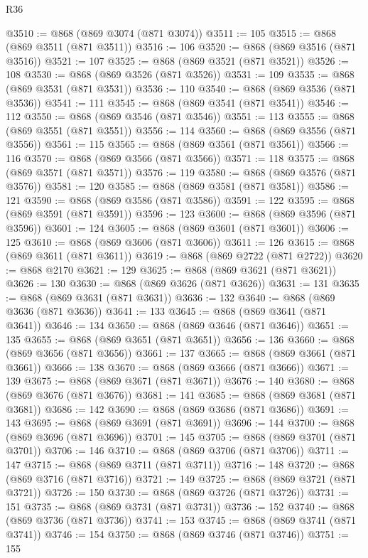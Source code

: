 \begin{lexlean}{R36}
\begin{coremodule}
@3510 := @868 (@869 @3074 (@871 @3074))
@3511 := 105
@3515 := @868 (@869 @3511 (@871 @3511))
@3516 := 106
@3520 := @868 (@869 @3516 (@871 @3516))
@3521 := 107
@3525 := @868 (@869 @3521 (@871 @3521))
@3526 := 108
@3530 := @868 (@869 @3526 (@871 @3526))
@3531 := 109
@3535 := @868 (@869 @3531 (@871 @3531))
@3536 := 110
@3540 := @868 (@869 @3536 (@871 @3536))
@3541 := 111
@3545 := @868 (@869 @3541 (@871 @3541))
@3546 := 112
@3550 := @868 (@869 @3546 (@871 @3546))
@3551 := 113
@3555 := @868 (@869 @3551 (@871 @3551))
@3556 := 114
@3560 := @868 (@869 @3556 (@871 @3556))
@3561 := 115
@3565 := @868 (@869 @3561 (@871 @3561))
@3566 := 116
@3570 := @868 (@869 @3566 (@871 @3566))
@3571 := 118
@3575 := @868 (@869 @3571 (@871 @3571))
@3576 := 119
@3580 := @868 (@869 @3576 (@871 @3576))
@3581 := 120
@3585 := @868 (@869 @3581 (@871 @3581))
@3586 := 121
@3590 := @868 (@869 @3586 (@871 @3586))
@3591 := 122
@3595 := @868 (@869 @3591 (@871 @3591))
@3596 := 123
@3600 := @868 (@869 @3596 (@871 @3596))
@3601 := 124
@3605 := @868 (@869 @3601 (@871 @3601))
@3606 := 125
@3610 := @868 (@869 @3606 (@871 @3606))
@3611 := 126
@3615 := @868 (@869 @3611 (@871 @3611))
@3619 := @868 (@869 @2722 (@871 @2722))
@3620 := @868 @2170
@3621 := 129
@3625 := @868 (@869 @3621 (@871 @3621))
@3626 := 130
@3630 := @868 (@869 @3626 (@871 @3626))
@3631 := 131
@3635 := @868 (@869 @3631 (@871 @3631))
@3636 := 132
@3640 := @868 (@869 @3636 (@871 @3636))
@3641 := 133
@3645 := @868 (@869 @3641 (@871 @3641))
@3646 := 134
@3650 := @868 (@869 @3646 (@871 @3646))
@3651 := 135
@3655 := @868 (@869 @3651 (@871 @3651))
@3656 := 136
@3660 := @868 (@869 @3656 (@871 @3656))
@3661 := 137
@3665 := @868 (@869 @3661 (@871 @3661))
@3666 := 138
@3670 := @868 (@869 @3666 (@871 @3666))
@3671 := 139
@3675 := @868 (@869 @3671 (@871 @3671))
@3676 := 140
@3680 := @868 (@869 @3676 (@871 @3676))
@3681 := 141
@3685 := @868 (@869 @3681 (@871 @3681))
@3686 := 142
@3690 := @868 (@869 @3686 (@871 @3686))
@3691 := 143
@3695 := @868 (@869 @3691 (@871 @3691))
@3696 := 144
@3700 := @868 (@869 @3696 (@871 @3696))
@3701 := 145
@3705 := @868 (@869 @3701 (@871 @3701))
@3706 := 146
@3710 := @868 (@869 @3706 (@871 @3706))
@3711 := 147
@3715 := @868 (@869 @3711 (@871 @3711))
@3716 := 148
@3720 := @868 (@869 @3716 (@871 @3716))
@3721 := 149
@3725 := @868 (@869 @3721 (@871 @3721))
@3726 := 150
@3730 := @868 (@869 @3726 (@871 @3726))
@3731 := 151
@3735 := @868 (@869 @3731 (@871 @3731))
@3736 := 152
@3740 := @868 (@869 @3736 (@871 @3736))
@3741 := 153
@3745 := @868 (@869 @3741 (@871 @3741))
@3746 := 154
@3750 := @868 (@869 @3746 (@871 @3746))
@3751 := 155

\end{coremodule}
\end{lexlean}
